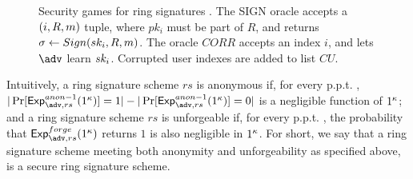 \begin{figure}[ht!]
  \centering
  \caption{Security games for ring signatures \cite{bkm06}. The SIGN oracle
    accepts a $(i,R,m)$ tuple, where $pk_i$ must be part of $R$, and
    returns $\sigma \gets Sign(sk_i,R,m)$. The oracle $CORR$ accepts an
    index $i$, and lets $\adv$ learn $sk_i$. Corrupted user indexes are
    added to list $CU$.}
  \label{fig:model-rs}  
\end{figure}

Intuitively, a ring signature scheme $rs$ is anonymous if, for every p.p.t.
\adv, $|\Pr[\Exp^{anon-1}_{\adv,rs}(1^\secpar)] = 1| -
|\Pr[\Exp^{anon-1}_{\adv,rs}(1^\secpar)] = 0|$ is a negligible function of
$1^\kappa$; and a ring signature scheme $rs$ is unforgeable if, for every
p.p.t. \adv, the probability that $\Exp^{forge}_{\adv,rs}(1^\secpar)$ returns
$1$ is also negligible in $1^\kappa$. For short, we say that a ring signature
scheme meeting both anonymity and unforgeability as specified above, is a secure
ring signature scheme.


